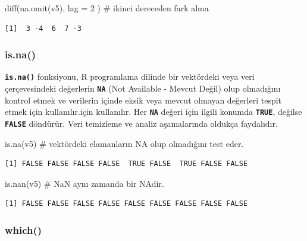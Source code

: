 \documentclass[
  letterpaper,
  DIV=11,
  numbers=noendperiod]{scrreprt}
\newenvironment{Shaded}{\begin{snugshade}}{\end{snugshade}}
\newcommand{\AttributeTok}[1]{\textcolor[rgb]{0.40,0.45,0.13}{#1}}
\newcommand{\CommentTok}[1]{\textcolor[rgb]{0.37,0.37,0.37}{#1}}
\newcommand{\DecValTok}[1]{\textcolor[rgb]{0.68,0.00,0.00}{#1}}
\newcommand{\FunctionTok}[1]{\textcolor[rgb]{0.28,0.35,0.67}{#1}}
\newcommand{\NormalTok}[1]{\textcolor[rgb]{0.00,0.23,0.31}{#1}}
\begin{document}
\begin{Shaded}
\begin{Highlighting}[]
\FunctionTok{diff}\NormalTok{(}\FunctionTok{na.omit}\NormalTok{(v5), }\AttributeTok{lag =} \DecValTok{2}\NormalTok{ ) }\CommentTok{\# ikinci dereceden fark alma}
\end{Highlighting}
\end{Shaded}

\begin{verbatim}
[1]  3 -4  6  7 -3
\end{verbatim}

\hypertarget{is.na}{%
\subsubsection{is.na()}\label{is.na}}

\textbf{\texttt{is.na()}} fonksiyonu, R programlama dilinde bir
vektördeki veya veri çerçevesindeki değerlerin \textbf{\texttt{NA}} (Not
Available - Mevcut Değil) olup olmadığını kontrol etmek ve verilerin
içinde eksik veya mevcut olmayan değerleri tespit etmek için
kullanılır.için kullanılır. Her \textbf{\texttt{NA}} değeri için ilgili
konumda \textbf{\texttt{TRUE}}, değilse \textbf{\texttt{FALSE}}
döndürür. Veri temizleme ve analiz aşamalarında oldukça faydalıdır.

\begin{Shaded}
\begin{Highlighting}[]
\FunctionTok{is.na}\NormalTok{(v5) }\CommentTok{\# vektördeki elamanların NA olup olmadığını test eder.}
\end{Highlighting}
\end{Shaded}

\begin{verbatim}
[1] FALSE FALSE FALSE FALSE  TRUE FALSE  TRUE FALSE FALSE
\end{verbatim}

\begin{Shaded}
\begin{Highlighting}[]
\FunctionTok{is.nan}\NormalTok{(v5) }\CommentTok{\# NaN aynı zamanda bir NA\textquotesingle{}dir.}
\end{Highlighting}
\end{Shaded}

\begin{verbatim}
[1] FALSE FALSE FALSE FALSE FALSE FALSE FALSE FALSE FALSE
\end{verbatim}

\hypertarget{which}{%
\subsubsection{which()}\label{which}}
\end{document}
